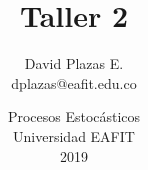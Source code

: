 \documentclass[11pt,letterpaper]{article}%
\title{\vspace{-1cm}Taller 2}
\author{David Plazas E. \\dplazas@eafit.edu.co}
\date{\vspace{-0.5cm}Procesos Estocásticos\\Universidad EAFIT\\2019}
\begin{document}
%

%
\begin{center}


\end{center}
\end{document}
